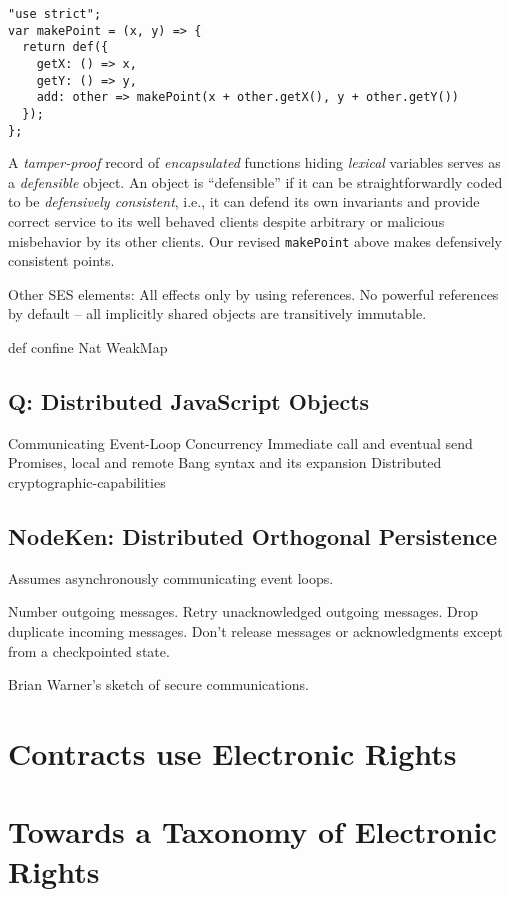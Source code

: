 \documentclass{llncs}
\begin{document}
\begin{verbatim}
"use strict";
var makePoint = (x, y) => {
  return def({
    getX: () => x,
    getY: () => y,
    add: other => makePoint(x + other.getX(), y + other.getY())
  });
};
\end{verbatim}

A \emph{tamper-proof} record of \emph{encapsulated} functions hiding \emph{lexical} variables serves as a \emph{defensible} object. An object is ``defensible'' if it can be straightforwardly coded to be \emph{defensively consistent}\cite{RobustComposition}, i.e., it can defend its own invariants and provide correct service to its well behaved clients despite arbitrary or malicious misbehavior by its other clients. Our revised {\tt makePoint} above makes defensively consistent points.

Other SES elements: 
All effects only by using references.
No powerful references by default -- all implicitly shared objects are transitively immutable. 

def
confine
Nat
WeakMap

\subsection{Q: Distributed JavaScript Objects}

Communicating Event-Loop Concurrency
Immediate call and eventual send
Promises, local and remote
Bang syntax and its expansion
Distributed cryptographic-capabilities

\subsection{NodeKen: Distributed Orthogonal Persistence}

Assumes asynchronously communicating event loops.

Number outgoing messages.
Retry unacknowledged outgoing messages.
Drop duplicate incoming messages.
Don't release messages or acknowledgments except from a checkpointed state.

Brian Warner's sketch of secure communications.

\section{Contracts use Electronic Rights}
\section{Towards a Taxonomy of Electronic Rights}
\end{document}
